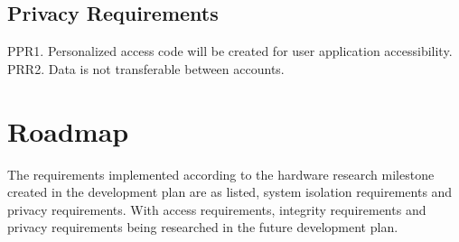 \documentclass{article}
\begin{document}
\subsection{Privacy Requirements}

PPR1. Personalized access code will be created for user application accessibility. 
\\PRR2. Data is not transferable between accounts.


\section{Roadmap}

The requirements implemented according to the hardware research milestone created in the development plan are as listed, system isolation requirements and privacy requirements. With access requirements, integrity requirements and privacy requirements being researched in the future development plan.
\end{document}
